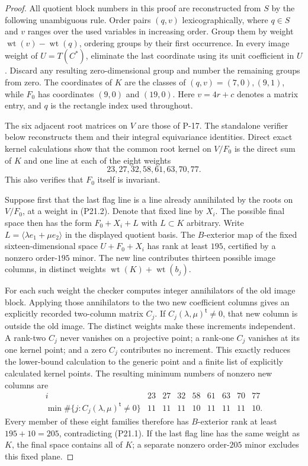 \begin{proof}
All quotient block numbers in this proof are reconstructed
from $S$ by the following unambiguous rule. Order pairs
$(q,v)$ lexicographically, where $q\in S$ and $v$ ranges
over the used variables in increasing order. Group them
by weight $\operatorname{wt}(v)-\operatorname{wt}(q)$,
ordering groups by their first occurrence. In every
image weight of $U=T(C^*)$, eliminate the last coordinate
using its unit coefficient in $U$. Discard any resulting
zero-dimensional group and number the remaining groups
from zero. The coordinates of $K$ are the classes of
$(q,v)=(7,0),(9,1)$, while $F_0$ has coordinates
$(9,0)$ and $(19,0)$. Here $v=4r+c$ denotes a matrix
entry, and $q$ is the rectangle index used throughout.

The six adjacent root matrices on $V$ are those of
P-17. The standalone verifier below reconstructs them
and their integral equivariance identities. Direct exact
kernel calculations show that the common root kernel
on $V/F_0$ is the direct sum of $K$ and one line at each
of the eight weights
\[
 23,27,32,58,61,63,70,77.
 \tag{P21.2}
\]
This also verifies that $F_0$ itself is invariant.

Suppose first that the last flag line is a line already
annihilated by the roots on $V/F_0$, at a weight in
(P21.2). Denote that fixed line by $X_i$. The possible
final space then has the form
$F_0+X_i+L$ with $L\subset K$ arbitrary. Write
$L=\langle\lambda e_1+\mu e_2\rangle$ in the displayed
quotient basis. The $B$-exterior map of the fixed
sixteen-dimensional space $U+F_0+X_i$ has rank at least
$195$, certified by a nonzero order-$195$ minor.
The new line contributes thirteen possible image
columns, in distinct weights
$\operatorname{wt}(K)+\operatorname{wt}(b_j)$.

For each such weight the checker computes integer
annihilators of the old image block. Applying those
annihilators to the two new coefficient columns gives
an explicitly recorded two-column matrix $C_j$.
If $C_j(\lambda,\mu)^{\mathsf t}\ne0$, that new column
is outside the old image. The distinct weights make
these increments independent. A rank-two $C_j$ never
vanishes on a projective point; a rank-one $C_j$ vanishes
at its one kernel point; and a zero $C_j$ contributes
no increment. This exactly reduces the lower-bound
calculation to the generic point and a finite list
of explicitly calculated kernel points. The resulting
minimum numbers of nonzero new columns are
\[
\begin{array}{c|rrrrrrrr}
i&23&27&32&58&61&63&70&77\\\hline
\min\#\{j:C_j(\lambda,\mu)^{\mathsf t}\ne0\}
 &11&11&11&10&11&11&11&10.
\end{array}
\]
Every member of these eight families therefore has
$B$-exterior rank at least $195+10=205$, contradicting
(P21.1). If the last flag line has the same weight
as $K$, the final space contains all of $K$; a separate
nonzero order-$205$ minor excludes this fixed plane.


\end{proof}
